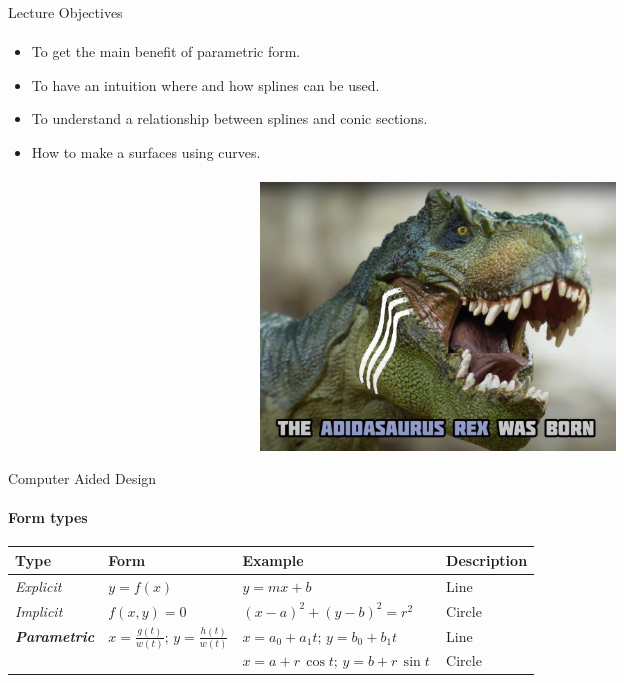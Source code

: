 \documentclass[aspectratio=169]{beamer}
\begin{document}
\begin{frame}[t]{Lecture Objectives}
    \framesubtitle{}
    \begin{itemize}
        \item To get the main benefit of parametric form.
        \item To have an intuition where and how splines can be used.
        \item To understand a relationship between splines and conic sections.
        \item How to make a surfaces using curves.
    \end{itemize}
\end{frame}

\begin{frame}[t]{}
\framesubtitle{}
    \begin{figure}[H]
        \centering\includegraphics[height=7.1cm,width=1\textwidth,keepaspectratio]{adidasaurus.png}
        \label{fig:adidasaurus.png}
    \end{figure}
\end{frame}

\begin{frame}[t]{Computer Aided Design}
    \framesubtitle{Form types}
    \begin{table}[H]
        \centering
        \begin{tabular}{llll}
        \textbf{Type} & \textbf{Form} & \textbf{Example} & \textbf{Description} \\ 
        \hline
        \textit{Explicit} & $y=f(x)\,\!$ & $y=mx+b\,\!$ & Line \\
        \textit{Implicit} & $f(x,y)=0\,\!$ & $\left(x-a\right)^{2}+\left(y-b\right)^{2}=r^{2}$ & Circle \\
        \multirow{2}{*}{\textit{\textbf{Parametric}}} & \multirow{2}{*}{${\displaystyle x={\frac {g(t)}{w(t)}};\,\!} {\displaystyle y={\frac {h(t)}{w(t)}}}$} & $x=a_{0}+a_{1}t;\,\! {\displaystyle y=b_{0}+b_{1}t\,\!}$ & Line \\
         &  & $x=a+r\,\cos t;\,\! {\displaystyle y=b+r\,\sin t\,\!}$ & Circle
        \end{tabular}
        \end{table}
    \end{frame}
\end{document}
